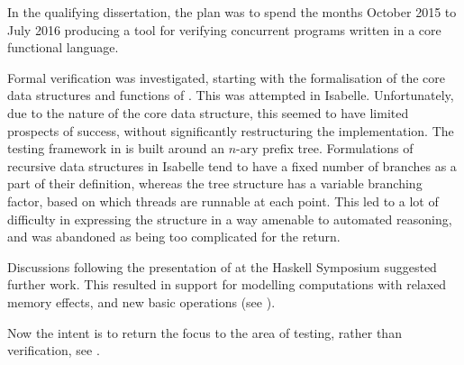 In the qualifying dissertation, the plan was to spend the months
October 2015 to July 2016 producing a tool for verifying concurrent
programs written in a core functional language.

Formal verification was investigated, starting with the formalisation
of the core data structures and functions of \dejafu{}. This was
attempted in Isabelle. Unfortunately, due to the nature of the core
data structure, this seemed to have limited prospects of success,
without significantly restructuring the implementation. The testing
framework in \dejafu{} is built around an $n$-ary prefix
tree. Formulations of recursive data structures in Isabelle tend to
have a fixed number of branches as a part of their definition, whereas
the \dejafu{} tree structure has a variable branching factor, based on
which threads are runnable at each point. This led to a lot of
difficulty in expressing the structure in a way amenable to automated
reasoning, and was abandoned as being too complicated for the return.

Discussions following the presentation of \dejafu{} at the Haskell
Symposium suggested further work. This resulted in support for
modelling computations with relaxed memory effects, and new basic
operations (see ).

Now the intent is to return the focus to the area of testing, rather
than verification, see .
